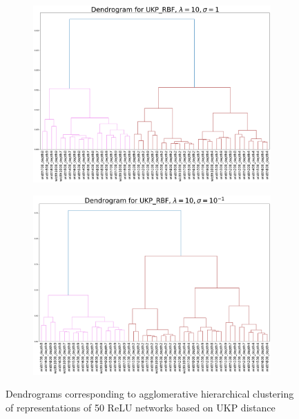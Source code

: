 \documentclass{article}
\theoremstyle{plain}
\newcommand{\metricstname}{UKP }
\begin{document}
\begin{figure}[!h]
    \begin{subfigure}[b]{0.45\textwidth}
        \includegraphics[width=\textwidth]{Appendix figures/mnist_experiments/Dendogram/Dendogram for UKP_dist_RBF_1.000000e+01_1.000000e+00.png}
    \end{subfigure}
    \hfill
    \begin{subfigure}[b]{0.45\textwidth}
        \includegraphics[width=\textwidth]{Appendix figures/mnist_experiments/Dendogram/Dendogram for UKP_dist_RBF_1.000000e+01_1.000000e-01.png}
    \end{subfigure}
    
    \caption{Dendrograms corresponding to agglomerative hierarchical clustering of representations of 50 ReLU networks based on \metricstname distance}
    \label{MNIST dendrograms}
\end{figure}
\end{document}
